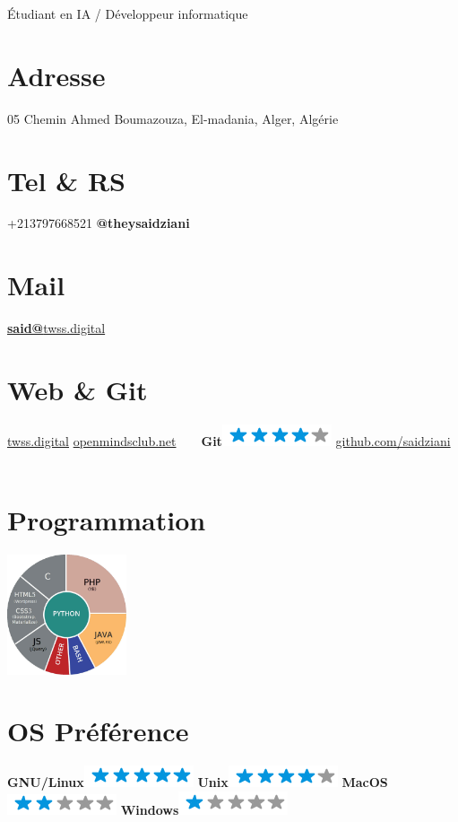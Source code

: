 \documentclass[]{friggeri-cv}
\begin{document}
      {Étudiant en IA / Développeur informatique}
      

\begin{aside}
  \section{Adresse}
    05 Chemin Ahmed Boumazouza,
    El-madania, Alger, Algérie
    ~
    ~
  \section{Tel \& RS}
    +213797668521
    {\textbf{@theysaidziani}}
    ~
    ~
  \section{Mail}
    \href{mailto:said@twss.digital}{\textbf{said@}twss.digital}
    ~
    ~
  \section{Web \& Git}
    \href{http://www.twss.digital}{twss.digital}
    \href{http://www.openmindsclub.net}{openmindsclub.net}
    ~
    ~
    \textbf{Git}\includegraphics[scale=0.40]{img/4stars.png}
    \href{https://github.com/saidziani}{github.com/saidziani}
    ~
    ~
  \section{Programmation}
    \includegraphics[width=100pt]{img/programmation.jpg}
    ~
    ~
  \section{OS Préférence}
    \textbf{GNU/Linux}\includegraphics[scale=0.40]{img/5stars.png}
    \textbf{Unix}\includegraphics[scale=0.40]{img/4stars.png}
    \textbf{MacOS}\includegraphics[scale=0.40]{img/2stars.png}
    \textbf{Windows}\includegraphics[scale=0.40]{img/1stars.png}
    ~
    ~

\end{aside}
\end{document}
